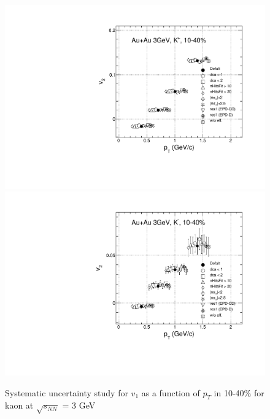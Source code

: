 \begin{figure}[h]
\includegraphics[scale=0.4]{chapter3/fig/sys/kaon/v1pt_kp_sys.pdf}
\includegraphics[scale=0.4]{chapter3/fig/sys/kaon/v1pt_km_sys.pdf}
\caption{Systematic uncertainty study for $v_{1}$ as a function of $p_{T}$ in 10-40\% for kaon at $\sqrt{s_{NN}}$ = 3 GeV}
\label{pion_v1y_sys}
\end{figure}

